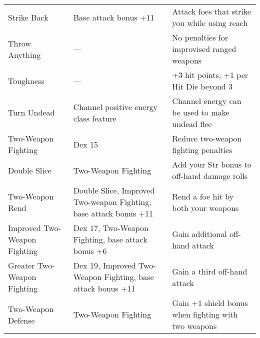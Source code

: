 \begin{table*}
\begin{tabularx}{\linewidth}{lXl}
Strike Back & Base attack bonus +11 & Attack foes that strike you while using reach\\
Throw Anything & --- & No penalties for improvised ranged weapons\\
Toughness & --- & +3 hit points, +1 per Hit Die beyond 3\\
Turn Undead & Channel positive energy class feature & Channel energy can be used to make undead flee\\
Two-Weapon Fighting & Dex 15 & Reduce two-weapon fighting penalties\\
\enspace Double Slice & Two-Weapon Fighting & Add your Str bonus to off-hand damage rolls\\
\enspace \enspace Two-Weapon Rend & Double Slice, Improved Two-weapon Fighting, base attack bonus +11 & Rend a foe hit by both your weapons\\
\enspace Improved Two-Weapon Fighting & Dex 17, Two-Weapon Fighting, base attack bonus +6 & Gain additional off-hand attack\\
\enspace \enspace Greater Two-Weapon Fighting & Dex 19, Improved Two-Weapon Fighting, base attack bonus +11 & Gain a third off-hand attack\\
\enspace Two-Weapon Defense & Two-Weapon Fighting & Gain +1 shield bonus when fighting with two weapons\\
\end{tabularx}
\end{table*}
